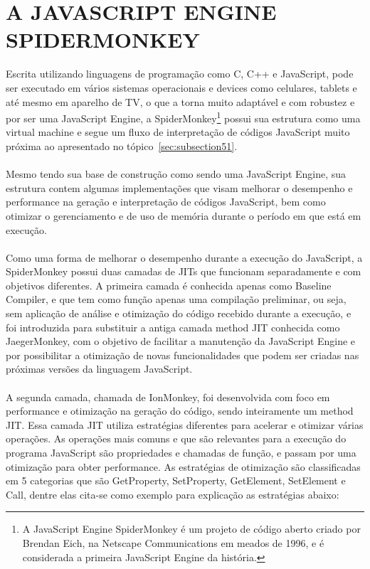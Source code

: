 \documentclass[12pt,a4paper]{article}
\begin{document}
\section{A JAVASCRIPT ENGINE SPIDERMONKEY}
\label{sec:section6}

Escrita utilizando linguagens de programação como C, C++ e JavaScript, pode ser executado em vários sistemas operacionais e devices como celulares, tablets e até mesmo em aparelho de TV, o que a torna muito adaptável e com robustez e por ser uma JavaScript Engine, a SpiderMonkey\footnote{A JavaScript Engine SpiderMonkey é um projeto de código aberto criado por Brendan Eich, na Netscape Communications em meados de 1996, e é considerada a primeira JavaScript Engine da história.} possui sua estrutura como uma virtual machine e segue um fluxo de interpretação de códigos JavaScript muito próxima ao apresentado no tópico~\ref{sec:subsection51}. \\
\\
Mesmo tendo sua base de construção como sendo uma JavaScript Engine, sua estrutura contem algumas implementações que visam melhorar o desempenho e performance na geração e interpretação de códigos JavaScript, bem como otimizar o gerenciamento e de uso de memória durante o período em que está em execução. \\
\\
Como uma forma de melhorar o desempenho durante a execução do JavaScript, a SpiderMonkey possui duas camadas de JITs que funcionam separadamente e com objetivos diferentes. A primeira camada é conhecida apenas como Baseline Compiler, e que tem como função apenas uma compilação preliminar, ou seja, sem aplicação de análise e otimização do código recebido durante a execução, e foi introduzida para substituir a antiga camada method JIT conhecida como JaegerMonkey, com o objetivo de facilitar a manutenção da JavaScript Engine e por possibilitar a otimização de novas funcionalidades que podem ser criadas nas próximas versões da linguagem JavaScript. \\
\\
A segunda camada, chamada de IonMonkey, foi desenvolvida com foco em performance e otimização na geração do código, sendo inteiramente um method JIT. Essa camada JIT utiliza estratégias diferentes para acelerar e otimizar várias operações. As operações mais comuns e que são relevantes para a execução do programa JavaScript são propriedades e chamadas de função, e passam por uma otimização para obter performance. As estratégias de otimização são classificadas em 5 categorias que são GetProperty, SetProperty, GetElement, SetElement e Call, dentre elas cita-se como exemplo para explicação as estratégias abaixo: \\
\end{document}
